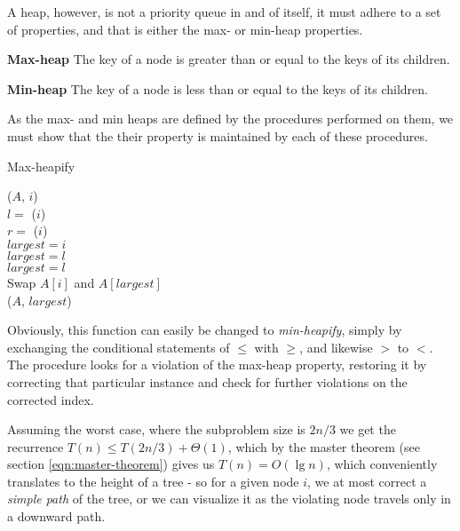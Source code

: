 A heap, however, is not a priority queue in and of itself, it must adhere to
a set of properties, and that is either the max- or min-heap properties.
\begin{description}
	\item \textbf{Max-heap} The key of a node is greater than or equal to the
keys of its children.
	\item \textbf{Min-heap} The key of a node is less than or equal to the
keys of its children.
\end{description}
As the max- and min heaps are defined by the procedures performed on them, we
must show that the their property is maintained by each of these procedures.

\begin{algorithm}[H]
	\caption{Max-heapify}
	\label{alg:max-heapify}
	
	
	
	
	\BlankLine
	\MaxHeapify($A$, $i$) \\
	\Begin
	{
		$l = $ \Left($i$) \\
		$r = $ \Right($i$) \\
		$largest = i$ \\
		{
			$largest = l$ \\
		}
		{
			$largest = l$ \\
		}
		{
			Swap $A[i]$ and $A[largest]$ \\
			\MaxHeapify($A$, $largest$)
		}
	}
\end{algorithm}
Obviously, this function can easily be changed to \textit{min-heapify}, simply
by exchanging the conditional statements of $\leq$ with $\geq$, and likewise
$>$ to $<$. The procedure looks for a violation of the max-heap property,
restoring it by correcting that particular instance and check for further
violations on the corrected index.

Assuming the worst case, where the subproblem size is $2n/3$ we get the
recurrence $T(n) \leq T(2n/3) + \Theta(1)$, which by the master theorem (see
section \ref{eqn:master-theorem}) gives us $T(n) = O(\lg n)$, which
conveniently translates to the height of a tree - so for a given node $i$, we
at most correct a \textit{simple path} of the tree, or we can visualize it as
the violating node travels only in a downward path.

